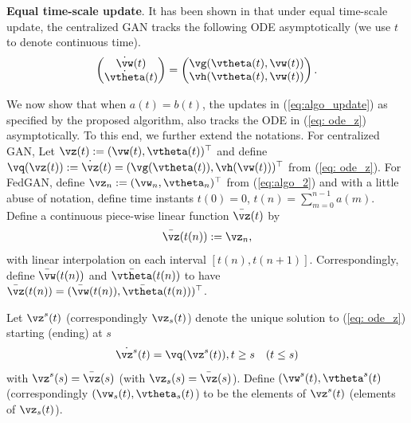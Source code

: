 \documentclass{article}
\begin{document}
	
	\textbf{Equal time-scale update}. It has been shown in \citep{nagarajan2017gradient, mescheder2017numerics} that under equal time-scale update, the centralized GAN tracks the following ODE asymptotically (we use $t$ to denote continuous time). 
	\begin{equation}
	\label{eq: ode_z}
	\begin{pmatrix}\dot{{\vw}}(t)\\ \dot{{\vtheta}}(t)\end{pmatrix} = 
	\begin{pmatrix}{\vg}({\vtheta}(t),{\vw}(t))\\ {\vh}({\vtheta}(t),{\vw}(t))\end{pmatrix}.
	\end{equation}
	
    We now show that when $a(t)=b(t)$, the updates  in (\ref{eq:algo_update}) as specified by the proposed algorithm, also tracks the ODE in (\ref{eq: ode_z}) asymptotically. To this end, we further extend the notations. For centralized GAN, Let $\vz(t):=(\vw(t),\vtheta(t))^\top$ and define $\vq(\vz(t)):=\dot{\vz}(t)=(\vg(\vtheta(t)), \vh(\vw(t)))^\top$ from (\ref{eq: ode_z}). For FedGAN, define $\vz_n:=(\vw_n,\vtheta_n)^\top$ from (\ref{eq:algo_2}) and with a little abuse of notation, define time instants $t(0)=0$, $t(n)=\sum_{m=0}^{n-1} a(m)$. Define a continuous piece-wise linear function
	$\bar{\vz}(t)$ by 
	\begin{equation}\label{eq: z bar}
	\bar{\vz}(t(n)):={\vz}_{n},
	\end{equation}
	with linear interpolation on each interval $[t(n), t(n+1)]$. Correspondingly, define $\bar{\vw}(t(n))$ and $\bar{\vtheta}(t(n))$ to have  $\bar{\vz}(t(n))=(\bar{\vw}(t(n)),\bar{\vtheta}(t(n)))^\top$.
	
	
	Let $\vz^s(t)$ (correspondingly $\vz_s(t)$) denote the unique solution to (\ref{eq: ode_z}) starting (ending) at $s$
	\begin{equation}
	\label{eq:ode_z_s}
	\dot{{\vz^s}}(t) = {\vq}({\vz^s}(t)), t\geq s \quad (t\leq s)
	\end{equation}
	with $\vz^s(s)=\bar{\vz}(s)$ (with $\vz_s(s)=\bar{\vz}(s)$).	Define $(\vw^s(t), \vtheta^s(t)$ (correspondingly  $(\vw_s(t), \vtheta_s(t)$)  to be the elements of  $\vz^s(t)$ (elements of $\vz_s(t)$).
	
\end{document}
